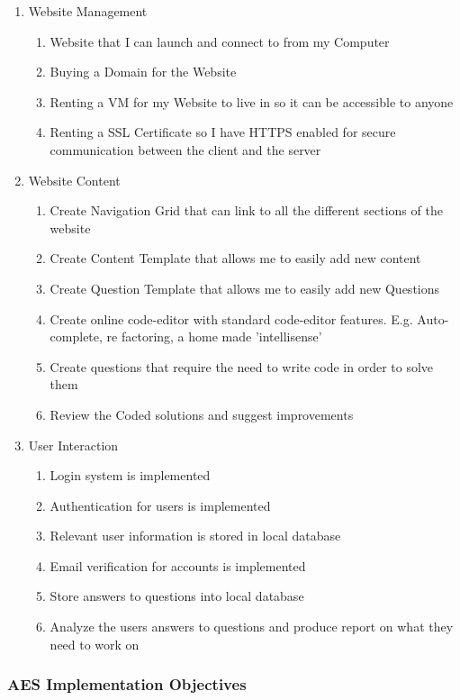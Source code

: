 \begin{enumerate}
\item{Website Management
	\begin{enumerate}
		\item{Website that I can launch and connect to from my Computer}
		\item{Buying a Domain for the Website}
		\item{Renting a VM for my Website to live in so it can be accessible to anyone}
		\item{Renting a SSL Certificate so I have HTTPS enabled for secure communication between the client and the server}
	\end{enumerate}
}
\item{Website Content
	\begin{enumerate}
		\item{Create Navigation Grid that can link to all the different sections of the website}
        \item{Create Content Template that allows me to easily add new content}
        \item{Create Question Template that allows me to easily add new Questions}
		\item{Create online code-editor with standard code-editor features. E.g. Auto-complete, re factoring, a home made 'intellisense'}
		\item{Create questions that require the need to write code in order to solve them}
		\item{Review the Coded solutions and suggest improvements}
	\end{enumerate}
}
\item{User Interaction
	\begin{enumerate}
		\item{Login system is implemented}
		\item{Authentication for users is implemented}
		\item{Relevant user information is stored in local database}
		\item{Email verification for accounts is implemented}
		\item{Store answers to questions into local database}
		\item{Analyze the users answers to questions and produce report on what they need to work on}
	\end{enumerate}
}
\end{enumerate}

\subsubsection{AES Implementation Objectives}

